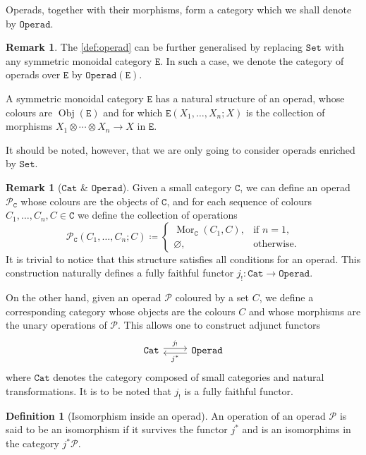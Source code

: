 \documentclass[11pt, reqno]{amsart}
\theoremstyle{definition}
\newtheorem{definition}[theorem]{Definition}
\newtheorem{remark}[theorem]{Remark}
\renewcommand{\emptyset}{\varnothing}
\newcommand{\cat}{\texttt}
\newcommand{\catfont}{\texttt}
\newcommand{\Set}{{\catfont{Set}}}          %
\newcommand{\Cat}{{\catfont{Cat}}}          %
\DeclareMathOperator{\Obj}{Obj}   %
\DeclareMathOperator{\Mor}{Mor}   %
\newcommand{\operad}{\mathcal}
\newcommand{\Operad}{{\catfont{Operad}}}
\begin{document}
Operads, together with their morphisms, form a category which we shall denote
by \(\Operad\).

\begin{remark}
\label{rem:operad-set-to-sym-mon-cat}
The \cref{def:operad} can be further generalised by replacing \(\Set\) with any
symmetric monoidal category \(\cat E\). In such a case, we denote the category
of operads over \(\cat E\) by \(\Operad(\cat E)\).

A symmetric monoidal category \(\cat E\) has a natural structure of an operad,
whose colours are \(\Obj(\cat E)\) and for which \(\cat E(X_1, \dots, X_n; X)\)
is the collection of morphisms \(X_1 \otimes \cdots \otimes X_n \to X\) in \(\cat E\).

It should be noted, however, that we are only going to consider operads
enriched by \(\Set\).
\end{remark}

\begin{remark}[\(\Cat\) \& \(\Operad\)]
\label{rem:operad-from-a-category}
Given a small category \(\cat C\), we can define an operad \(\operad P_{\cat C}\)
whose colours are the objects of \(\cat C\), and for each sequence of colours
\(C_1, \dots, C_n, C \in \cat C\) we define the collection of operations
\[
\operad P_{\cat C}(C_1, \dots, C_n; C) \coloneq
\begin{cases}
  \Mor_{\cat C}(C_1, C), &\text{if } n = 1, \\
  \emptyset, &\text{otherwise}.
\end{cases}
\]
It is trivial to notice that this structure satisfies all conditions for an
operad. This construction naturally defines a fully faithful functor \(j_!:
\Cat \to \Operad\).

On the other hand, given an operad \(\operad P\) coloured by a set \(C\), we
define a corresponding category whose objects are the colours \(C\) and whose
morphisms are the unary operations of \(\operad P\). This allows one to
construct adjunct functors
\[
    \begin{tikzcd}
        \Cat \ar[r, shift left, "j_{!}"] &\Operad \ar[l, shift left, "j^{*}"]
    \end{tikzcd}
\]
where \(\Cat\) denotes the category composed of small categories and natural
transformations. It is to be noted that \(j_!\) is a fully faithful functor.
\end{remark}

\begin{definition}[Isomorphism inside an operad]
An operation of an operad \(\operad P\) is said to be an isomorphism if it
survives the functor \(j^*\) and is an isomorphims in the category \(j^*
\operad P\).
\end{definition}
\end{document}
